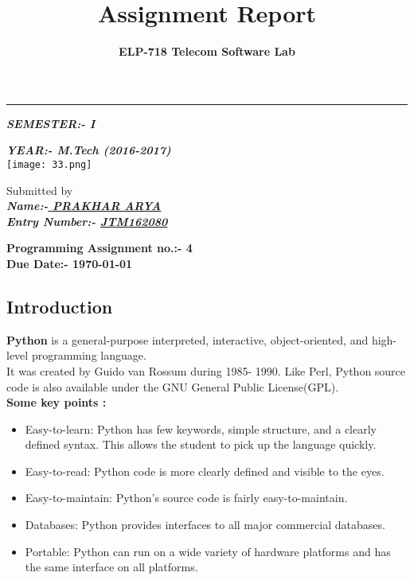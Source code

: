 \documentclass[12pt,a4paper]{article}
\title{\huge{\textbf{Assignment Report}}}
\author{\large{\textbf{ELP-718 Telecom Software Lab}}}
\date{}
\begin{document}
\maketitle
{\centering
\textcolor{black}{\rule{\textwidth}{3pt}}   %


\bigskip
\bigskip

\large{\textbf{\emph{SEMESTER:- I}}}\\
\bigskip
\large{\textbf{\emph{YEAR:- M.Tech (2016-2017)}}\\
\bigskip
\texttt{[image: 33.png]}
\bigskip

Submitted by\\
\bigskip
\large{\textbf{\emph{Name:-\underline{ PRAKHAR ARYA}}}}\\
\bigskip
\large{\textbf{\emph{Entry Number:- \underline{JTM162080}}}}\\
\bigskip
\bigskip

\large{\textbf{Programming Assignment no.:- 4}\\
\large{\textbf{Due Date:- \today}}

\newpage
\tableofcontents
\newpage
\listoffigures

\flushleft


\newpage
{}
\newpage
\begin{center}
\section{
Introduction}
\flushleft
\textbf{Python} is a general-purpose interpreted, interactive, object-oriented, and high-level
programming language.\\ It was created by Guido van Rossum during 1985- 1990.
Like Perl, Python source code is also available under the GNU General Public License(GPL).\\
\vspace{10mm}
\textbf{ Some key points :}
\begin{itemize}
\item Easy-to-learn: Python has few keywords, simple structure, and a clearly defined syntax. This allows the student to pick up the language quickly.
\item Easy-to-read: Python code is more clearly defined and visible to the eyes.
\item Easy-to-maintain: Python's source code is fairly easy-to-maintain.
\item Databases: Python provides interfaces to all major commercial databases.
\item Portable: Python can run on a wide variety of hardware platforms and has the
same interface on all platforms.
\end{itemize}
\end{center}
\newpage
\begin{center}

\end{center}}}}
\end{document}
